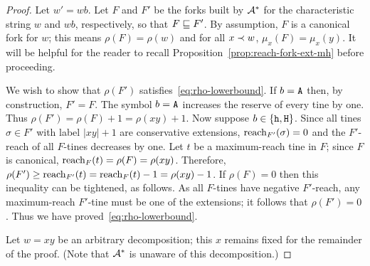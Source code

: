 \begin{proof}  
  Let $w' = wb$.
  Let $F$ and $F'$ be the forks built by $\mathcal{A}^*$ 
  for the characteristic string $w$ and $wb$, respectively, 
  so that $F \sqsubseteq F'$.
  By assumption, $F$ is a canonical fork for $w$; 
  this means $\rho(F) = \rho(w)$ and
  for all $x \prec w$, $\mu_x(F) = \mu_x(y)$. 
  It will be helpful for the reader to recall Proposition~\ref{prop:reach-fork-ext-mh} before proceeding.


  We wish to show that 
  $\rho(F')$ satisfies~\eqref{eq:rho-lowerbound}. 
  If $b = \mathtt{A}$ then, by construction,
  $F' = F$. 
  The symbol $b = \mathtt{A}$ increases the reserve 
  of every tine by one. 
  Thus  
  $
  \rho(F') 
  = \rho(F) + 1
  = \rho(xy)  + 1
  $. 
  Now suppose $b \in \{\mathtt{h}, \mathtt{H}\}$. 
  Since all tines $\sigma \in F'$ with label $|xy| + 1$ 
  are conservative extensions, $\operatorname{reach}_{F'}(\sigma) = 0$ 
  and the $F'$-reach of all $F$-tines decreases by one. 
  Let $t$ be a maximum-reach tine in $F$; 
  since $F$ is canonical, $\operatorname{reach}_F(t) = \rho(F) = \rho(xy)$.
  Therefore, 
  $\rho(F') \geq \operatorname{reach}_{F'}(t) = \operatorname{reach}_{F}(t) - 1 = \rho(xy) - 1$. 
  If $\rho(F) = 0$ then this inequality can be tightened, as follows. 
  As all $F$-tines have negative $F'$-reach, 
  any maximum-reach $F'$-tine 
  must be one of the extensions; 
  it follows that $\rho(F') = 0$. 
  Thus we have proved~\eqref{eq:rho-lowerbound}. 



  Let $w = xy$ be an arbitrary decomposition; 
  this $x$ remains fixed for the remainder of the proof. 
  (Note that $\mathcal{A}^*$ is unaware of this decomposition.) 
  


\end{proof}
